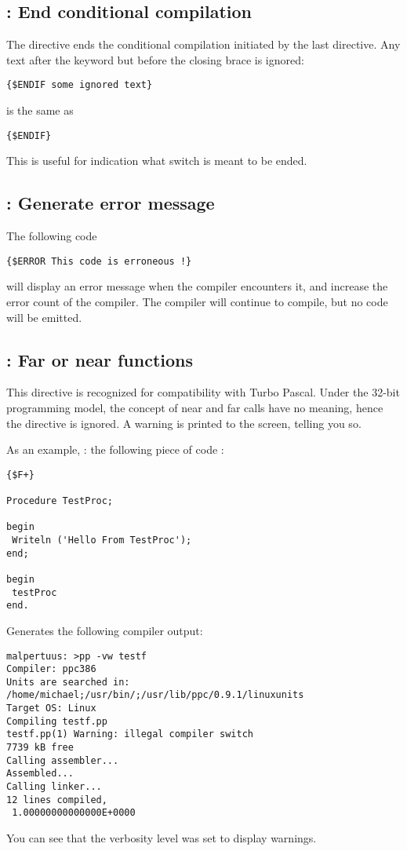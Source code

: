 \documentclass{report}
\begin{document}
\subsection{ : End conditional compilation}

The  directive ends the conditional compilation initiated by the
last  directive. Any text after the  keyword but
before the closing brace is ignored:
\begin{verbatim}
{$ENDIF some ignored text}
\end{verbatim}
is the same as
\begin{verbatim}
{$ENDIF}
\end{verbatim}
This is useful for indication what switch is meant to be ended.

\subsection{ : Generate error message}

The following code
\begin{verbatim}
{$ERROR This code is erroneous !}
\end{verbatim}
will display an error message when the compiler encounters it,
and increase the error count of the compiler.
The compiler will continue to compile, but no code will be emitted.

\subsection{ : Far or near functions}
This directive is recognized for compatibility with Turbo Pascal. Under the
32-bit programming model, the concept of near and far calls have no meaning,
hence the directive is ignored. A warning is printed to the screen, telling
you so.

As an example, : the following piece of code :
\begin{verbatim}
{$F+}

Procedure TestProc;

begin
 Writeln ('Hello From TestProc');
end;

begin
 testProc
end.
\end{verbatim}
Generates the following compiler output:
\begin{verbatim}
malpertuus: >pp -vw testf
Compiler: ppc386
Units are searched in: /home/michael;/usr/bin/;/usr/lib/ppc/0.9.1/linuxunits
Target OS: Linux
Compiling testf.pp
testf.pp(1) Warning: illegal compiler switch
7739 kB free
Calling assembler...
Assembled...
Calling linker...
12 lines compiled,
 1.00000000000000E+0000
\end{verbatim}
You can see that the verbosity level was set to display warnings.
\end{document}
